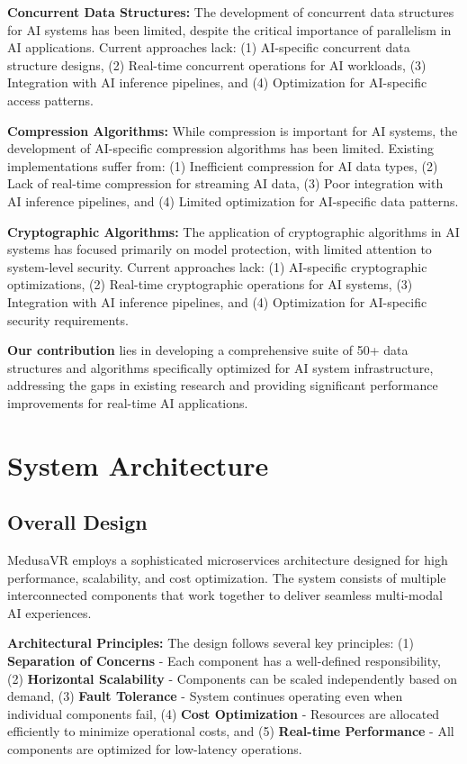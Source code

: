 \documentclass[conference]{IEEEtran}
\begin{document}
\textbf{Concurrent Data Structures:} The development of concurrent data structures for AI systems has been limited, despite the critical importance of parallelism in AI applications. Current approaches lack: (1) AI-specific concurrent data structure designs, (2) Real-time concurrent operations for AI workloads, (3) Integration with AI inference pipelines, and (4) Optimization for AI-specific access patterns.

\textbf{Compression Algorithms:} While compression is important for AI systems, the development of AI-specific compression algorithms has been limited. Existing implementations suffer from: (1) Inefficient compression for AI data types, (2) Lack of real-time compression for streaming AI data, (3) Poor integration with AI inference pipelines, and (4) Limited optimization for AI-specific data patterns.

\textbf{Cryptographic Algorithms:} The application of cryptographic algorithms in AI systems has focused primarily on model protection, with limited attention to system-level security. Current approaches lack: (1) AI-specific cryptographic optimizations, (2) Real-time cryptographic operations for AI systems, (3) Integration with AI inference pipelines, and (4) Optimization for AI-specific security requirements.

\textbf{Our contribution} lies in developing a comprehensive suite of 50+ data structures and algorithms specifically optimized for AI system infrastructure, addressing the gaps in existing research and providing significant performance improvements for real-time AI applications.

\section{System Architecture}

\subsection{Overall Design}
MedusaVR employs a sophisticated microservices architecture designed for high performance, scalability, and cost optimization. The system consists of multiple interconnected components that work together to deliver seamless multi-modal AI experiences.

\textbf{Architectural Principles:} The design follows several key principles: (1) \textbf{Separation of Concerns} - Each component has a well-defined responsibility, (2) \textbf{Horizontal Scalability} - Components can be scaled independently based on demand, (3) \textbf{Fault Tolerance} - System continues operating even when individual components fail, (4) \textbf{Cost Optimization} - Resources are allocated efficiently to minimize operational costs, and (5) \textbf{Real-time Performance} - All components are optimized for low-latency operations.
\end{document}
